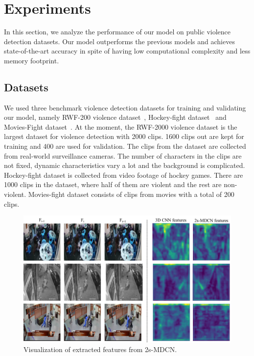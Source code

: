 \section{Experiments}
    In this section, we analyze the performance of our model on public violence detection datasets. Our model outperforms the previous models and achieves state-of-the-art accuracy in spite of having low computational complexity and less memory footprint.

    \subsection{Datasets}
    We used three benchmark violence detection datasets for training and validating our model, namely  RWF-200 violence dataset~\cite{cheng2019rwf}, Hockey-fight dataset~\cite{hockey_nievas2011violence} and Movies-Fight dataset~\cite{movie_nievas2011violence}. 
    At the moment, the RWF-2000 violence dataset is the largest dataset for violence detection with 2000 clips. 1600 clips out are kept for training and 400 are used for validation. The clips from the dataset are collected from real-world surveillance cameras. The number of characters in the clips are not fixed, dynamic characteristics vary a lot and the background is complicated.
    Hockey-fight dataset is collected from video footage of hockey games. There are 1000 clips in the dataset, where half of them are violent and the rest are non-violent. Movies-fight dataset consists of clips from movies with a total of 200 clips. 
    
    \begin{figure}[]
	\centering
	\includegraphics[width=0.9\linewidth]{new_images/features.pdf}
	\caption{Visualization of extracted features from 2s-MDCN.}
	\label{fig:features_vis}
	\end{figure}


